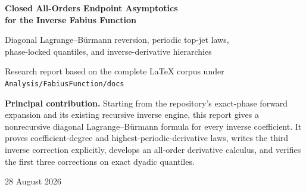 \documentclass[11pt,oneside]{article}
\numberwithin{equation}{section}
\theoremstyle{definition}
\theoremstyle{remark}
\begin{document}
\hypersetup{pageanchor=false}

\begin{titlepage}
\centering
\vspace*{1.5cm}
{\Huge\bfseries Closed All-Orders Endpoint Asymptotics\\[0.25em]
for the Inverse Fabius Function\par}
\vspace{0.8cm}
{\Large Diagonal Lagrange--Bürmann reversion, periodic top-jet laws,\\
phase-locked quantiles, and inverse-derivative hierarchies\par}
\vspace{1.2cm}
{\large Research report based on the complete LaTeX corpus under\\
\texttt{Analysis/FabiusFunction/docs}\par}
\vfill
\begin{tcolorbox}[enhanced,colback=softteal,colframe=teal,width=0.92\textwidth,boxrule=0.8pt,arc=3pt]
\textbf{Principal contribution.}
Starting from the repository's exact-phase forward expansion and its existing recursive inverse engine, this report gives a nonrecursive diagonal Lagrange--Bürmann formula for every inverse coefficient.  It proves coefficient-degree and highest-periodic-derivative laws, writes the third inverse correction explicitly, develops an all-order derivative calculus, and verifies the first three corrections on exact dyadic quantiles.
\end{tcolorbox}
\vfill
{\large 28 August 2026\par}
\end{titlepage}
\hypersetup{pageanchor=true}
\end{document}
